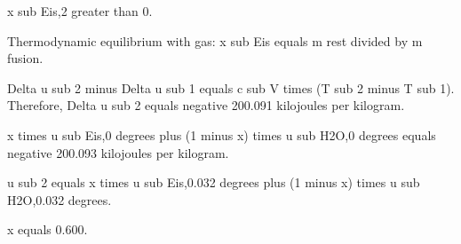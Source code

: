 x sub Eis,2 greater than 0.  

Thermodynamic equilibrium with gas:  
x sub Eis equals m rest divided by m fusion.  

Delta u sub 2 minus Delta u sub 1 equals c sub V times (T sub 2 minus T sub 1).  
Therefore, Delta u sub 2 equals negative 200.091 kilojoules per kilogram.  

x times u sub Eis,0 degrees plus (1 minus x) times u sub H2O,0 degrees equals negative 200.093 kilojoules per kilogram.  

u sub 2 equals x times u sub Eis,0.032 degrees plus (1 minus x) times u sub H2O,0.032 degrees.  

x equals 0.600.